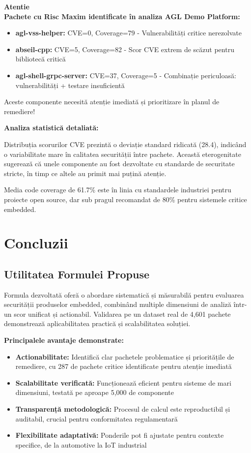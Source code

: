 \documentclass[12pt,a4paper]{article}
\newenvironment{warningbox}{%
\begin{leftbar}
\color{black}
\textbf{Atentie}\\[0.5em]
}{%
\end{leftbar}
}
\begin{document}
\begin{warningbox}
\textbf{Pachete cu Risc Maxim identificate în analiza AGL Demo Platform:}

\begin{itemize}
\item \textbf{agl-vss-helper:} CVE=0, Coverage=79 - Vulnerabilități critice nerezolvate
\item \textbf{abseil-cpp:} CVE=5, Coverage=82 - Scor CVE extrem de scăzut pentru bibliotecă critică
\item \textbf{agl-shell-grpc-server:} CVE=37, Coverage=5 - Combinație periculoasă: vulnerabilități + testare insuficientă
\end{itemize}

Aceste componente necesită atenție imediată și prioritizare în planul de remediere!
\end{warningbox}

\textbf{Analiza statistică detaliată:}

Distribuția scorurilor CVE prezintă o deviație standard ridicată (28.4), indicând o variabilitate mare în calitatea securității între pachete. Această eterogenitate sugerează că unele componente au fost dezvoltate cu standarde de securitate stricte, în timp ce altele au primit mai puțină atenție.

Media code coverage de 61.7\% este în linia cu standardele industriei pentru proiecte open source, dar sub pragul recomandat de 80\% pentru sistemele critice embedded.

\section{Concluzii}

\subsection{Utilitatea Formulei Propuse}

Formula dezvoltată oferă o abordare sistematică și măsurabilă pentru evaluarea securității produselor embedded, combinând multiple dimensiuni de analiză într-un scor unificat și actionabil. Validarea pe un dataset real de 4,601 pachete demonstrează aplicabilitatea practică și scalabilitatea soluției.

\textbf{Principalele avantaje demonstrate:}

\begin{itemize}
\item \textbf{Actionabilitate:} Identifică clar pachetele problematice și prioritățile de remediere, cu 287 de pachete critice identificate pentru atenție imediată
\item \textbf{Scalabilitate verificată:} Funcționează eficient pentru sisteme de mari dimensiuni, testată pe aproape 5,000 de componente
\item \textbf{Transparență metodologică:} Procesul de calcul este reproductibil și auditabil, crucial pentru conformitatea regulamentară
\item \textbf{Flexibilitate adaptativă:} Ponderile pot fi ajustate pentru contexte specifice, de la automotive la IoT industrial
\end{itemize}
\end{document}
